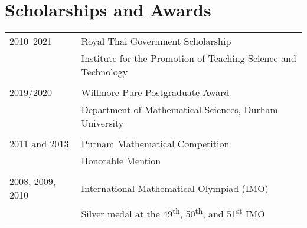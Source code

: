 \documentclass[a4paper,10pt]{article}
\begin{document}
\section{Scholarships and Awards}
\begin{tabular}{p{2.5cm} l}
	2010--2021 & Royal Thai Government Scholarship\\
	& Institute for the Promotion of Teaching Science and Technology\\&\\
	2019/2020 & Willmore Pure Postgraduate Award\\
	& Department of Mathematical Sciences, Durham University\\&\\
	2011 and 2013 & Putnam Mathematical Competition\\
	& Honorable Mention\\&\\
	2008, 2009, 2010 & International Mathematical Olympiad (IMO)\\ &Silver medal at the 49\textsuperscript{th}, 50\textsuperscript{th}, and 51\textsuperscript{st} IMO
\end{tabular}

\end{document}
